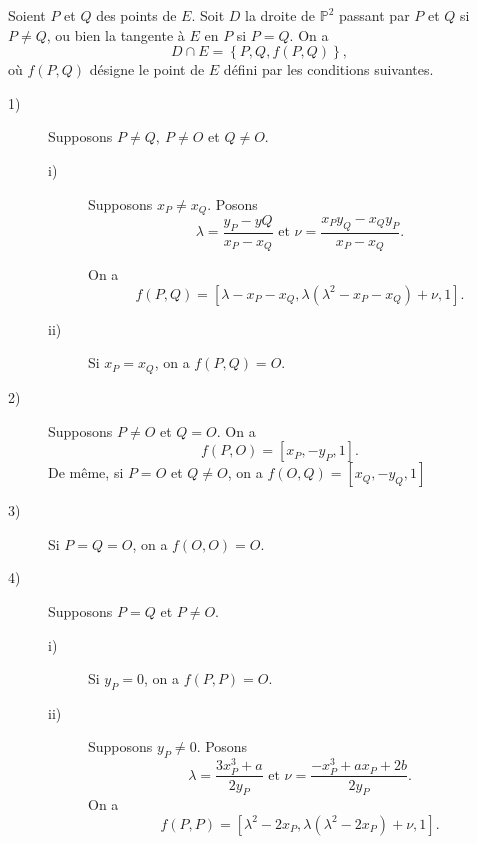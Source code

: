 
\begin{proposition}
    Soient $P$ et $Q$ des points de $E$. Soit $D$ la droite de $\mathbb{P}^2$ passant par $P$ et $Q$ si $P \neq Q$, ou bien la tangente à $E$ en $P$ si $P = Q$. On a
    \[
    D \cap E = \left\{ P, Q, f(P,Q) \right\}
    ,\] 
    où $f(P,Q)$ désigne le point de $E$ défini par les conditions suivantes.
    \begin{description}
        \item[1)] Supposons $P \neq Q, \ P \neq O$ et $Q \neq O$.
            \begin{description}
                \item[i)] Supposons $x_{P} \neq x_{Q}$. Posons
                    \[
                    \lambda = \frac{y_{P} - y{Q}}{x_{P} - x_{Q}} \text{ et } \nu = \frac{x_{P}y_{Q} - x_{Q}y_{P}}{x_{P} - x_{Q}}
                    .\] 

On a 
\[
f(P,Q) = \left[ \lambda - x_{P} - x_{Q}, \lambda \left( \lambda^2 - x_{P} - x_{Q} \right) + \nu, 1 \right]
.\] 
                \item[ii)] Si $x_{P} = x_{Q}$, on a $f(P,Q) = O$.
            \end{description}
        \item[2)] Supposons $P \neq O$ et $Q = O$. On a
            \[
            f(P,O) = \left[ x_{P}, -y_{P}, 1 \right]
            .\] 
            De même, si $P = O$ et $Q \neq O$, on a $f(O,Q) = \left[ x_{Q}, -y_{Q}, 1 \right]$
        \item[3)] Si $P = Q = O$, on a $f(O,O) = O$.
        \item[4)]  Supposons $P = Q$ et $P \neq O$.
            \begin{description}
                \item[i)] Si $y_{P} = 0$, on a $f(P,P) = O$.
                \item[ii)] Supposons $y_{P} \neq 0$. Posons
                    \[
                    \lambda = \frac{3x_{P}^3 + a}{2y_{P}} \text{ et } \nu = \frac{-x_{P}^3 + ax_{P} + 2b}{2y_{P}}
                    .\] 
On a
\[
f(P,P) = \left[ \lambda^2 - 2 x_{P}, \lambda\left( \lambda^2 - 2x_{P} \right) + \nu, 1 \right]
.\] 
            \end{description}
    \end{description}
\end{proposition}

\begin{demonstration}
    
\end{demonstration}
